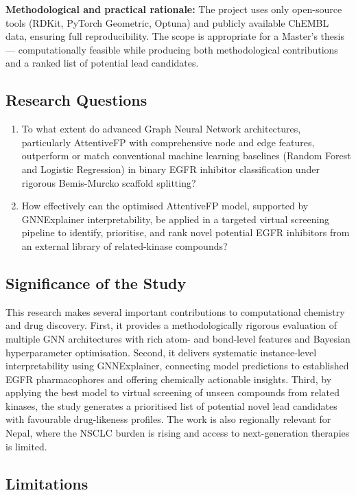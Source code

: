 \textbf{Methodological and practical rationale:} The project uses only open-source tools (RDKit, PyTorch Geometric, Optuna) and publicly available ChEMBL data, ensuring full reproducibility. The scope is appropriate for a Master's thesis — computationally feasible while producing both methodological contributions and a ranked list of potential lead candidates.

\subsection{Research Questions}

\begin{enumerate}
    \item To what extent do advanced Graph Neural Network architectures, particularly AttentiveFP with comprehensive node and edge features, outperform or match conventional machine learning baselines (Random Forest and Logistic Regression) in binary EGFR inhibitor classification under rigorous Bemis-Murcko scaffold splitting?
    \item How effectively can the optimised AttentiveFP model, supported by GNNExplainer interpretability, be applied in a targeted virtual screening pipeline to identify, prioritise, and rank novel potential EGFR inhibitors from an external library of related-kinase compounds?
\end{enumerate}

\subsection{Significance of the Study}

This research makes several important contributions to computational chemistry and drug discovery. First, it provides a methodologically rigorous evaluation of multiple GNN architectures with rich atom- and bond-level features and Bayesian hyperparameter optimisation. Second, it delivers systematic instance-level interpretability using GNNExplainer, connecting model predictions to established EGFR pharmacophores and offering chemically actionable insights. Third, by applying the best model to virtual screening of unseen compounds from related kinases, the study generates a prioritised list of potential novel lead candidates with favourable drug-likeness profiles. The work is also regionally relevant for Nepal, where the NSCLC burden is rising and access to next-generation therapies is limited.

\subsection{Limitations}

